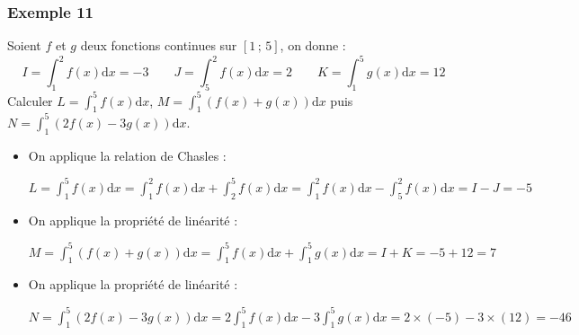 \documentclass[11pt, hyperref={urlcolor=red,%
            linkcolor=blue, %
            colorlinks=true}]{beamer}
\newcommand{\Interff}[2]{\left[#1\, ;\, #2\right]}
\newcommand{\dx}{\ensuremath{\text{d}x}}		%
\begin{document}
\begin{frame}
\frametitle{Exemple  11}
\label{exemple11}

Soient $f$ et $g$ deux fonctions continues sur $\Interff{1}{5}$, on donne :
$$I=\int_{1}^{2} f(x)\dx=-3   \qquad J=\int_{5}^{2} f(x)\dx=2 \qquad  K=\int_{1}^{5} g(x)\dx=12$$
Calculer $L=\int_{1}^{5} f(x)\dx$, $M=\int_{1}^{5} (f(x)+g(x))\dx$ puis $N=\int_{1}^{5} (2f(x)-3g(x))\dx$.

\begin{itemize}
	
\item  On applique la relation de Chasles : 

$L=\int_{1}^{5} f(x)\dx =\int_{1}^{2} f(x)\dx + \int_{2}^{5} f(x)\dx  = \int_{1}^{2} f(x)\dx  - \int_{5}^{2} f(x)\dx = I - J=-5 $

\item On applique la propriété de linéarité  :

$M=\int_{1}^{5} (f(x)+g(x))\dx = \int_{1}^{5} f(x)\dx  + \int_{1}^{5} g(x)\dx  = I + K = -5+12=7$


\item On applique la propriété de linéarité  :

$N=\int_{1}^{5} (2f(x)-3g(x))\dx=2\int_{1}^{5}f(x)\dx - 3 \int_{1}^{5}g(x)\dx = 2 \times (-5) -3 \times (12)= -46$

\end{itemize}


\end{frame}
\end{document}
